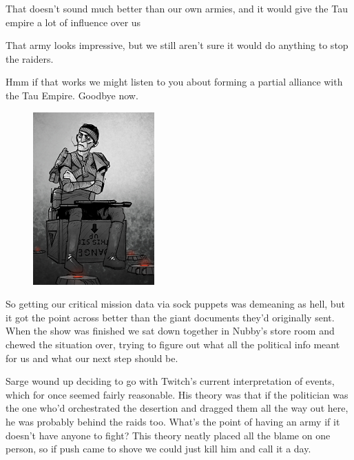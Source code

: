 That doesn't sound much better than our own armies, and it would give the Tau empire a lot of influence over us



That army looks impressive, but we still aren't sure it would do anything to stop the raiders.



Hmm if that works we might listen to you about forming a partial alliance with the Tau Empire. 
Goodbye now.



\begin{figure}
	\begin{center}
		\includegraphics[width=\figwidth]{pics/10/49.png}
	\end{center}
\end{figure}
So getting our critical mission data via sock puppets was demeaning as hell, but it got the point across better than the giant documents they'd originally sent. 
When the show was finished we sat down together in Nubby's store room and chewed the situation over, trying to figure out what all the political info meant for us and what our next step should be.

Sarge wound up deciding to go with Twitch's current interpretation of events, which for once seemed fairly reasonable. 
His theory was that if the politician was the one who'd orchestrated the desertion and dragged them all the way out here, he was probably behind the raids too. 
What's the point of having an army if it doesn't have anyone to fight? 
This theory neatly placed all the blame on one person, so if push came to shove we could just kill him and call it a day.

